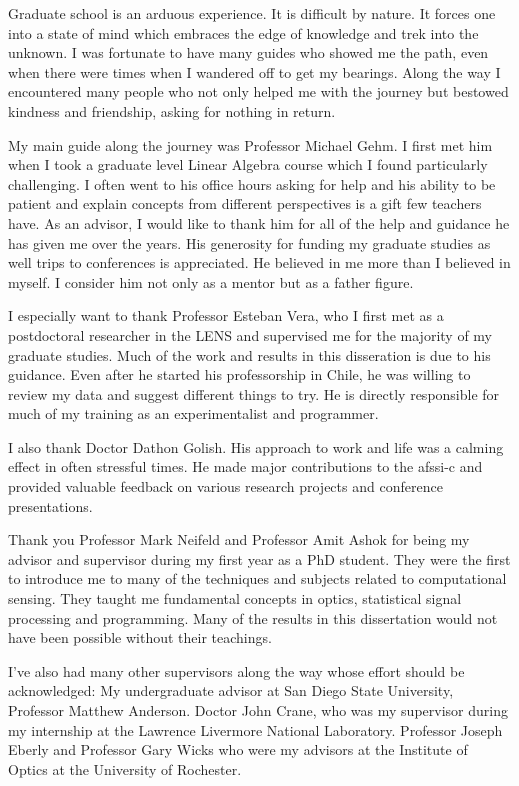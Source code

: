 Graduate school is an arduous experience. It is difficult by nature. It forces one into a state of mind which embraces the edge of knowledge and trek into the unknown. I was fortunate to have many guides who showed me the path, even when there were times when I wandered off to get my bearings. Along the way I encountered many people who not only helped me with the journey but bestowed kindness and friendship, asking for nothing in return.

My main guide along the journey was Professor Michael Gehm. I first met him when I took a graduate level Linear Algebra course which I found particularly challenging. I often went to his office hours asking for help and his ability to be patient and explain concepts from different perspectives is a gift few teachers have. As an advisor, I would like to thank him for all of the help and guidance he has given me over the years. His generosity for funding my graduate studies as well trips to conferences is appreciated. He believed in me more than I believed in myself. I consider him not only as a mentor but as a father figure.

I especially want to thank Professor Esteban Vera, who I first met as a postdoctoral researcher in the \gls{LENS} and supervised me for the majority of my graduate studies. Much of the work and results in this disseration is due to his guidance. Even after he started his professorship in Chile, he was willing to review my data and suggest different things to try. He is directly responsible for much of my training as an experimentalist and programmer. 

I also thank Doctor Dathon Golish. His approach to work and life was a calming effect in often stressful times. He made major contributions to the \gls{afssi-c} and provided valuable feedback on various research projects and conference presentations.

Thank you Professor Mark Neifeld and Professor Amit Ashok for being my advisor and supervisor during my first year as a PhD student. They were the first to introduce me to many of the techniques and subjects related to computational sensing. They taught me fundamental concepts in optics, statistical signal processing and programming. Many of the results in this dissertation would not have been possible without their teachings.

I've also had many other supervisors along the way whose effort should be acknowledged: My undergraduate advisor at San Diego State University, Professor Matthew Anderson. Doctor John Crane, who was my supervisor during my internship at the Lawrence Livermore National Laboratory. Professor Joseph Eberly and Professor Gary Wicks who were my advisors at the Institute of Optics at the University of Rochester. 

